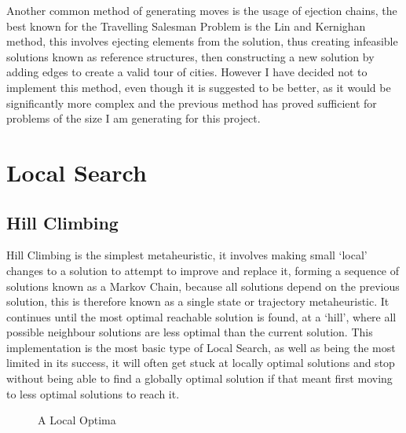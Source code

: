 \documentclass[]{final_report}
\begin{document}
Another common method of generating moves is the usage of ejection chains, the best known for the Travelling Salesman Problem is the Lin and Kernighan method, this involves ejecting elements from the solution, thus creating infeasible solutions known as reference structures, then constructing a new solution by adding edges to create a valid tour of cities\cite{siarry:2016}. However I have decided not to implement this method, even though it is suggested to be better, as it would be significantly more complex and the previous method has proved sufficient for problems of the size I am generating for this project.

\newpage
\section*{Local Search}

\subsection*{Hill Climbing}

Hill Climbing is the simplest metaheuristic, it involves making small `local' changes to a solution to attempt to improve and replace it, forming a sequence of solutions known as a Markov Chain, because all solutions depend on the previous solution, this is therefore known as a single state or trajectory metaheuristic\cite{siarry:2016}. It continues until the most optimal reachable solution is found, at a `hill', where all possible neighbour solutions are less optimal than the current solution. This implementation is the most basic type of Local Search, as well as being the most limited in its success, it will often get stuck at locally optimal solutions and stop without being able to find a globally optimal solution if that meant first moving to less optimal solutions to reach it.

\begin{figure}[h]
	\centering
	\fboxsep 2mm
	\caption{\label{fig:optima} A Local Optima}
\end{figure}
\end{document}
